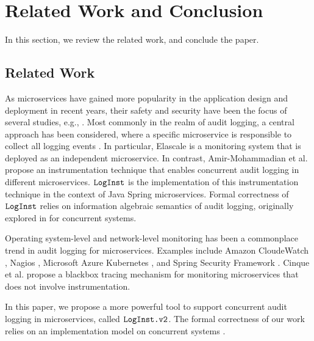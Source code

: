 \section{Related Work and Conclusion} \label{sec:rwc}

In this section, we review the related work, and conclude the paper.

\subsection{Related Work} \label{sec:relwork}

As microservices have gained more popularity in the application design and deployment in recent years, their safety and security have been the focus of several studies, e.g., \cite{mateus2021security, nkomo2019software, nehme2019securing, yu2019survey}. Most commonly in the realm of audit logging, a central approach has been considered, where a specific microservice is responsible to collect all logging events \cite{barabanov2021security, kazanavivcius2019migrating}. In particular, Elascale \cite{khazaei2017elascale} is a monitoring system that is deployed as an independent microservice. In contrast, Amir-Mohammadian et al. \cite{stpsa21} propose an instrumentation technique that enables concurrent audit logging in different microservices. $\texttt{LogInst}$ \cite{github1} is the implementation of this instrumentation technique in the context of Java Spring microservices. Formal correctness of $\texttt{LogInst}$ relies on information algebraic \cite{Kohlas14} semantics of audit logging, originally explored in \cite{lsfa20}  for concurrent systems. 

Operating system-level and network-level monitoring  has been a commonplace trend in audit logging for microservices. Examples include Amazon CloudeWatch \cite{cloudwatch}, Nagios \cite{nagios}, Microsoft Azure Kubernetes \cite{kuber}, and Spring Security Framework \cite{nguyen2019applying}. Cinque et al. \cite{cinque2019microservices} propose a blackbox tracing mechanism for monitoring microservices that does not involve instrumentation. 

In this paper, we propose a more powerful tool to support concurrent audit logging in microservices, called $\texttt{LogInst.v2}$. The formal correctness of our work relies on an implementation model on concurrent systems \cite{amirmoh-tr21}.


